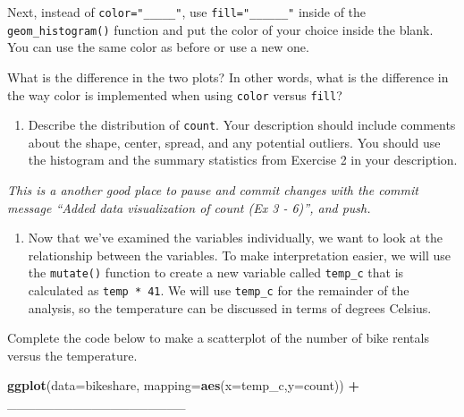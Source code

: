 \documentclass[]{book}
\newenvironment{Shaded}{\begin{snugshade}}{\end{snugshade}}
\newcommand{\KeywordTok}[1]{\textcolor[rgb]{0.13,0.29,0.53}{\textbf{#1}}}
\newcommand{\DataTypeTok}[1]{\textcolor[rgb]{0.13,0.29,0.53}{#1}}
\newcommand{\DecValTok}[1]{\textcolor[rgb]{0.00,0.00,0.81}{#1}}
\newcommand{\StringTok}[1]{\textcolor[rgb]{0.31,0.60,0.02}{#1}}
\newcommand{\OperatorTok}[1]{\textcolor[rgb]{0.81,0.36,0.00}{\textbf{#1}}}
\newcommand{\NormalTok}[1]{#1}
\providecommand{\tightlist}{%
  \setlength{\itemsep}{0pt}\setlength{\parskip}{0pt}}
\begin{document}
Next, instead of \texttt{color="\_\_\_\_\_"}, use
\texttt{fill="\_\_\_\_\_\_"} inside of the \texttt{geom\_histogram()}
function and put the color of your choice inside the blank. You can use
the same color as before or use a new one.

What is the difference in the two plots? In other words, what is the
difference in the way color is implemented when using \texttt{color}
versus \texttt{fill}?

\begin{enumerate}
\def\labelenumi{\arabic{enumi}.}
\setcounter{enumi}{5}
\tightlist
\item
  Describe the distribution of \texttt{count}. Your description should
  include comments about the shape, center, spread, and any potential
  outliers. You should use the histogram and the summary statistics from
  Exercise 2 in your description.
\end{enumerate}

\emph{This is a another good place to pause and commit changes with the
commit message ``Added data visualization of count (Ex 3 - 6)'', and
push.}

\begin{enumerate}
\def\labelenumi{\arabic{enumi}.}
\setcounter{enumi}{6}
\tightlist
\item
  Now that we've examined the variables individually, we want to look at
  the relationship between the variables. To make interpretation easier,
  we will use the \texttt{mutate()} function to create a new variable
  called \texttt{temp\_c} that is calculated as \texttt{temp\ *\ 41}. We
  will use \texttt{temp\_c} for the remainder of the analysis, so the
  temperature can be discussed in terms of degrees Celsius.
\end{enumerate}

\begin{Shaded}
\end{Shaded}

Complete the code below to make a scatterplot of the number of bike
rentals versus the temperature.

\begin{Shaded}
\begin{Highlighting}[]
\KeywordTok{ggplot}\NormalTok{(}\DataTypeTok{data=}\NormalTok{bikeshare, }\DataTypeTok{mapping=}\KeywordTok{aes}\NormalTok{(}\DataTypeTok{x=}\NormalTok{temp_c,}\DataTypeTok{y=}\NormalTok{count)) }\OperatorTok{+}
\StringTok{  }\NormalTok{___________________}
\end{Highlighting}
\end{Shaded}
\end{document}
